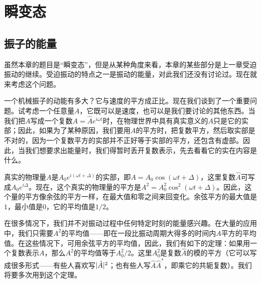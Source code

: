 \chapter{瞬变态}

\section{振子的能量}

虽然本章的题目是“瞬变态”，但是从某种角度来看，本章的某些部分是上一章受迫振动的继续。受迫振动的特点之一是振动的能量，对此我们还没有讨论过。现在就来考虑这个问题。

一个机械振子的动能有多大？它与速度的平方成正比。现在我们谈到了一个重要问题。试考虑一个任意量$A$，它既可以是速度，也可以是我们要讨论的其他东西。当我们把$A$写成一个复数$A=\hat{A}e^{i\omega t}$时，在物理世界中具有真实意义的$A$只是它的实部；因此，如果为了某种原因，我们要用$A$的平方时，把复数平方，然后取实部是不对的，因为一个复数平方的实部并不正好等于实部的平方，还包含有虚部。因此，当我们想要求出能量时，我们得暂时丢开复数表示，先去看看它的实在内容是什么。

真实的物理量$A$是$A_0e^{i(\omega t+\Delta)}$的实部，即$A=A_0\cos(\omega t+\Delta)$，这里复数$\hat{A}$可写成$A_0e^{i\Delta}$。现在，这个真实的物理量的平方是$A^2=A_0^2\cos^2(\omega t + \Delta)$。因此，这个量的平方像余弦的平方一样，在最大值和零之间来回变化。余弦平方的最大值是$1$，最小值是$0$，它的平均值是$1/2$。

在很多情况下，我们并不对振动过程中任何特定时刻的能量感兴趣。在大量的应用中，我们只需要$A^2$的平均值——即在一段比振动周期大得多的时间内$A$平方的平均值。在这些情况下，可用余弦平方的平均值，因此，我们有如下的定理：如果用一个复数表示$A$，那么$A^2$的平均值等于$A^2_0/2$。这里$A_0^2$是复数$\hat{A}$的模的平方（它可以写成很多形式——有些人喜欢写$\lvert\hat{A}\rvert^2$；也有些人写$\hat{A}\hat{A}^*$，即乘它的共轭复数）。我们将要多次用到这个定理。

